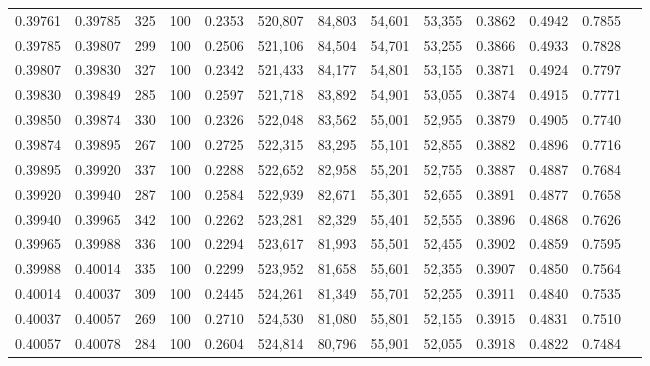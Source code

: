 \begin{tabular}{rrrrrrrrrrrrr}
0.39761 & 0.39785 &    325 & 100 &                                     0.2353 & 520,807 &  84,803 &  54,601 &  53,355 & 0.3862 & 0.4942 & 0.7855 \\
0.39785 & 0.39807 &    299 & 100 &                                     0.2506 & 521,106 &  84,504 &  54,701 &  53,255 & 0.3866 & 0.4933 & 0.7828 \\
0.39807 & 0.39830 &    327 & 100 &                                     0.2342 & 521,433 &  84,177 &  54,801 &  53,155 & 0.3871 & 0.4924 & 0.7797 \\
0.39830 & 0.39849 &    285 & 100 &                                     0.2597 & 521,718 &  83,892 &  54,901 &  53,055 & 0.3874 & 0.4915 & 0.7771 \\
0.39850 & 0.39874 &    330 & 100 &                                     0.2326 & 522,048 &  83,562 &  55,001 &  52,955 & 0.3879 & 0.4905 & 0.7740 \\
0.39874 & 0.39895 &    267 & 100 &                                     0.2725 & 522,315 &  83,295 &  55,101 &  52,855 & 0.3882 & 0.4896 & 0.7716 \\
0.39895 & 0.39920 &    337 & 100 &                                     0.2288 & 522,652 &  82,958 &  55,201 &  52,755 & 0.3887 & 0.4887 & 0.7684 \\
0.39920 & 0.39940 &    287 & 100 &                                     0.2584 & 522,939 &  82,671 &  55,301 &  52,655 & 0.3891 & 0.4877 & 0.7658 \\
0.39940 & 0.39965 &    342 & 100 &                                     0.2262 & 523,281 &  82,329 &  55,401 &  52,555 & 0.3896 & 0.4868 & 0.7626 \\
0.39965 & 0.39988 &    336 & 100 &                                     0.2294 & 523,617 &  81,993 &  55,501 &  52,455 & 0.3902 & 0.4859 & 0.7595 \\
0.39988 & 0.40014 &    335 & 100 &                                     0.2299 & 523,952 &  81,658 &  55,601 &  52,355 & 0.3907 & 0.4850 & 0.7564 \\
0.40014 & 0.40037 &    309 & 100 &                                     0.2445 & 524,261 &  81,349 &  55,701 &  52,255 & 0.3911 & 0.4840 & 0.7535 \\
0.40037 & 0.40057 &    269 & 100 &                                     0.2710 & 524,530 &  81,080 &  55,801 &  52,155 & 0.3915 & 0.4831 & 0.7510 \\
0.40057 & 0.40078 &    284 & 100 &                                     0.2604 & 524,814 &  80,796 &  55,901 &  52,055 & 0.3918 & 0.4822 & 0.7484 \\

\end{tabular}
